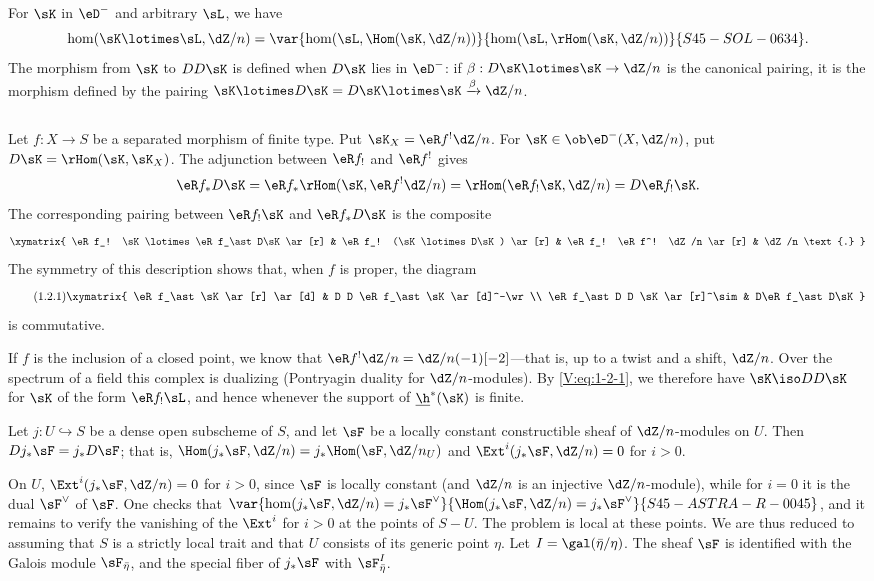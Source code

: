 For $\sK$ in $\eD^-$ and arbitrary $\sL$, we have
\[
  \hom(\sK\lotimes \sL,\dZ/n) = \var{\hom(\sL,\Hom(\sK,\dZ/n))}{\hom(\sL,\rHom(\sK,\dZ/n))}{S45-SOL-0634} \text{.}
\]
The morphism from $\sK$ to $DD\sK$ is defined when $D\sK$ lies in $\eD^-$:
if $\beta:D\sK\lotimes\sK\to \dZ/n$ is the canonical pairing, it is the
morphism defined by the pairing
$\sK\lotimes D\sK=D\sK\lotimes \sK \xrightarrow\beta \dZ/n$.


\subsection{}\label{V:1-2}

Let $f:X\to S$ be a separated morphism of finite type. Put
$\sK_X=\eR f^!\dZ/n$. For $\sK\in \ob\eD^-(X,\dZ/n)$, put
$D\sK = \rHom(\sK,\sK_X)$. The adjunction between $\eR f_!$ and $\eR f^!$
gives
\[
  \eR f_\ast D\sK = \eR f_\ast \rHom(\sK,\eR f^! \dZ/n) = \rHom(\eR f_! \sK,\dZ/n) = D\eR f_! \sK \text{.}
\]
The corresponding pairing between $\eR f_!\sK$ and $\eR f_\ast D\sK$ is the composite
\[\xymatrix{
  \eR f_! \sK\lotimes \eR f_\ast D\sK \ar[r]
    & \eR f_! (\sK\lotimes D\sK) \ar[r]
    & \eR f_! \eR f^! \dZ/n \ar[r]
    & \dZ/n \text{.}
}\]
The symmetry of this description shows that, when $f$ is proper, the diagram
\begin{equation*}\tag{1.2.1}\label{V:eq:1-2-1}
\xymatrix{
  \eR f_\ast \sK \ar[r] \ar[d]
    & D D \eR f_\ast \sK \ar[d]^-\wr \\
  \eR f_\ast D D \sK \ar[r]^\sim
    & D\eR f_\ast D\sK
}
\end{equation*}
is commutative.

If $f$ is the inclusion of a closed point, we know that
$\eR f^!\dZ/n=\dZ/n(-1)[-2]$---that is, up to a twist and a shift, $\dZ/n$.
Over the spectrum of a field this complex is dualizing (Pontryagin duality
for $\dZ/n$-modules). By \eqref{V:eq:1-2-1}, we therefore have
$\sK\iso D D\sK$ for $\sK$ of the form $\eR f_!\sL$, and hence whenever the
support of $\underline\h^*(\sK)$ is finite.


\begin{theorem_}\label{V:1-3}
Let $j:U\hookrightarrow S$ be a dense open subscheme of $S$, and let $\sF$
be a locally constant constructible sheaf of $\dZ/n$-modules on $U$. Then
$D j_\ast \sF = j_\ast D \sF$; that is,
$\Hom(j_\ast \sF,\dZ/n) = j_\ast\Hom(\sF,\dZ/n_U)$ and
$\Ext^i(j_\ast\sF,\dZ/n) = 0$ for $i>0$.
\end{theorem_}

On $U$, $\Ext^i(j_\ast\sF,\dZ/n)=0$ for $i>0$, since $\sF$ is locally
constant (and $\dZ/n$ is an injective $\dZ/n$-module), while for $i=0$ it is
the dual $\sF^\vee$ of $\sF$. One checks that
$\var{\hom(j_\ast\sF,\dZ/n)=j_\ast\sF^\vee}{\Hom(j_\ast\sF,\dZ/n)=j_\ast\sF^\vee}{S45-ASTRA-R-0045}$, and it remains to verify the
vanishing of the $\Ext^i$ for $i>0$ at the points of $S-U$. The
problem is local at these points. We are thus reduced to assuming that $S$
is a strictly local trait and that $U$ consists of its generic point $\eta$.
Let $I=\gal(\bar\eta/\eta)$. The sheaf $\sF$ is identified with the Galois
module $\sF_{\bar\eta}$, and the special fiber of $j_\ast \sF$ with
$\sF_{\bar\eta}^I$.


